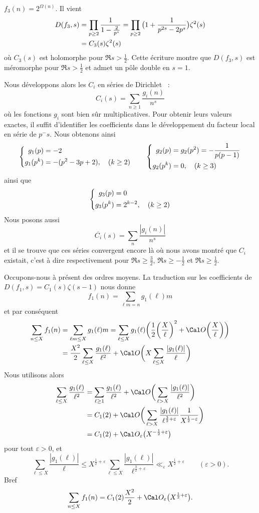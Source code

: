 \item  $f_3(n)=2^{\Omega(n)}$. Il vient
$$
\aligned
D(f_3,s)
&=\prod_{p\ge2}\frac{1}{1-\frac{2}{p^s}}
=\prod_{p\ge2}\big(1+\frac{1}{p^{2s}-2p^s}\big)
\zeta^2(s)
\\&=C_3(s)\zeta^2(s)
\endaligned
$$
o\`u $C_3(s)$ est holomorphe pour $\Re s>\tfrac12$. Cette \'ecriture
montre que $D(f_3,s)$ est m\'eromorphe pour $\Re s>\tfrac12$ et admet
un p\^ole double en $s=1$.
\endroster

Nous d\'eveloppons alors les $C_i$ en s\'eries de Dirichlet ~:
$$
C_i(s)=\sum_{n\ge1}\frac{g_i(n)}{n^s}
$$
o\`u les fonctions $g_i$ sont bien s\^ur multiplicatives. Pour obtenir
leurs valeurs exactes, il suffit d'identifier les coefficients dans le
d\'eveloppement du facteur local en s\'erie de $p^-s$. Nous obtenons
ainsi
$$
\left\{
\aligned
g_1(p)&=-2\\
g_1(p^k)&=-(p^2-3p+2), \quad(k\ge2)
\endaligned
\right.
\qquad
\left\{
\aligned
g_2(p)&=g_2(p^2)=-\frac{1}{p(p-1)}\\
g_2(p^k)&=0, \quad(k\ge3)
\endaligned
\right.
$$
ainsi que
$$
\left\{
\aligned
g_3(p)&=0\\
g_3(p^k)&=2^{k-2}, \quad(k\ge2)
\endaligned
\right.
$$
Nous posons aussi
$$
\overline{C_i}(s)=\sum_n\frac{|g_i(n)|}{n^{s}}
$$
et il se trouve que ces s\'eries convergent encore l\`a o\`u nous
avons montr\'e que $C_i$ existait, c'est \`a dire respectivement pour
$\Re s\ge\tfrac32$, $\Re s\ge-\tfrac12$ et $\Re s\ge\tfrac12$.

\bigskip
Occupons-nous \`a pr\'esent des ordres moyens. La traduction sur les
coefficients de $D(f_1,s)=C_1(s)\zeta(s-1)$ nous donne
$$
f_1(n)=\sum_{\ell m=n}g_1(\ell)m
$$
et par cons\'equent
$$
\aligned
\sum_{n\le X}f_1(n)
&=\sum_{\ell m\le X}g_1(\ell)m
=\sum_{\ell\le X}g_1(\ell)
\bigg(\frac12\bigg(\frac X\ell\bigg)^2
+\Cal O\bigg(\frac X\ell\bigg)\bigg)
\\&=\frac{X^2}{2}
\sum_{\ell\le X}\frac{g_1(\ell)}{\ell^2}
+\Cal O\bigg(X \sum_{\ell\le X}\frac{|g_1(\ell)|}{\ell}\bigg)
\endaligned
$$
Nous utilisons alors
\let\ve=\varepsilon
$$
\aligned
\sum_{\ell\le X}\frac{g_1(\ell)}{\ell^2}
&=
\sum_{\ell\ge 1}\frac{g_1(\ell)}{\ell^2}
+\Cal O\bigg(
\sum_{\ell> X}\frac{|g_1(\ell)|}{\ell^2}
\bigg)
\\&=C_1(2)+\Cal O\bigg(
\sum_{\ell> X}\frac{|g_1(\ell)|}{\ell^{\frac32+\ve}}\frac{1}{X^{\frac12-\ve}}
\bigg)
\\&=C_1(2)+\Cal O_\ve\big(X^{-\frac12+\ve}\big)
\endaligned
$$
pour tout $\ve>0$,
et
$$
\sum_{\ell\le X}\frac{|g_1(\ell)|}{\ell}
\le
X^{\frac12+\ve}\sum_{\ell\le X}\frac{|g_1(\ell)|}{\ell^{\frac32+\ve}}
\ll_\ve X^{\frac12+\ve}\qquad(\ve>0).
$$
Bref
$$
\sum_{n\le X}f_1(n)=C_1(2)\frac{X^2}{2}+\Cal O_\ve\big(X^{\frac12+\ve}\big).
$$

